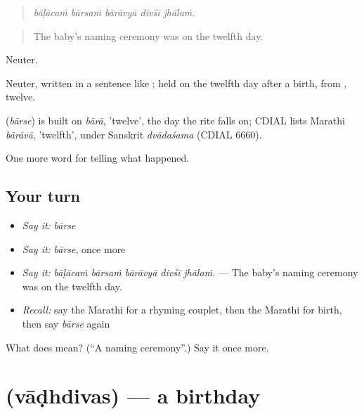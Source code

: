 \begin{quote}
\emph{bāḷācaṁ bārsaṁ bārāvyā divśī jhālaṁ.}
\end{quote}

\begin{quote}
The baby's naming ceremony was on the twelfth day.
\end{quote}

Neuter.

Neuter, written  in a sentence like ; held on the twelfth day after a birth, from , twelve.

\begin{cousinweb}
\textbf{} (\emph{bārse}) is built on \emph{bārā}, 'twelve', the day the rite falls on; CDIAL lists Marathi \emph{bārāvā}, 'twelfth', under Sanskrit \emph{dvādaśama} (CDIAL 6660).
\end{cousinweb}

\begin{grammarlens}[title={What you've built}]
One more word for telling what happened.
\end{grammarlens}

\subsection*{Your turn}
\begin{itemize}
\raggedright
  \item \emph{Say it:} \emph{bārse}
  \item \emph{Say it:} \emph{bārse}, once more
  \item \emph{Say it:} \emph{bāḷācaṁ bārsaṁ bārāvyā divśī jhālaṁ.} — The baby's naming ceremony was on the twelfth day.
  \item \emph{Recall:} say the Marathi for a rhyming couplet, then the Marathi for birth, then say \emph{bārse} again
\end{itemize}

\begin{tcolorbox}[breakable,colback=teal!4,colframe=teal!35!black,title={Before you move on}]
What does  mean? (\textquotedblleft{}A naming ceremony\textquotedblright{}.) Say it once more.
\end{tcolorbox}
\section[\texorpdfstring{\mr{वाढदिवस} (vāḍhdivas)}{वाढदिवस (vāḍhdivas)}]{ (vāḍhdivas) — a birthday}

